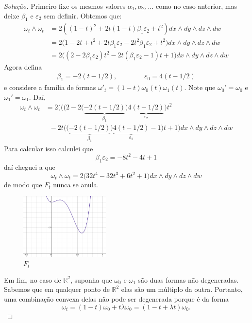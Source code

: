 \begin{proof}[Solução]
Primeiro fixe os mesmos valores $\alpha_1,\alpha_2,\ldots$ como no caso anterior, mas deixe $\beta_1$ e $\varepsilon_2$ sem definir. Obtemos que:
\begin{align*}
\omega_t\wedge \omega_t&=2\left( (1-t)^2+2t(1-t)\beta_1\varepsilon_2+t^2 \right)  dx\wedge dy\wedge dz\wedge dw\\
&=2\Big( 1-2t+t^2+2t\beta_1\varepsilon_2-2t^2\beta_1\varepsilon_2+t^2 \Big)dx\wedge dy\wedge dz\wedge dw\\
&=2\Big((2-2\beta_1\varepsilon_2)t^2-2t(\beta_1\varepsilon_2-1)t+1\Big)dx\wedge dy\wedge dz\wedge dw
\end{align*}
Agora defina
\begin{align*}
	\beta_1=-2(t-1/2),\qquad \qquad \varepsilon_0=4(t-1/2) 
\end{align*}
e considere a família de formas  $\omega'_t=(1-t)\omega_0(t) \omega_1(t)$. Note que $\omega_0'=\omega_0$ e $\omega_1'=\omega_1$. Daí,
\begin{align*}
\omega_t\wedge \omega_t&=2\Bigg(\big((2-2\big(\underbrace{-2(t-1/2)}_{\beta_1}\big)\underbrace{4(t-1/2)}_{\varepsilon_2}\big)t^2\\
&\; \;-2t\Big(\big(\underbrace{-2(t-1/2)}_{\beta_1}\big)\underbrace{4(t-1/2)}_{\varepsilon_2}-1\Big)t+1\Bigg)dx\wedge dy\wedge dz\wedge dw
\end{align*}
Para calcular isso calculei que
\[\beta_1\varepsilon_2=-8t^2-4t+1\]
daí cheguei a que
\[\omega_t\wedge \omega_t=2\big(32t^4-32t^3+6t^2+1\big)dx\wedge dy\wedge dz\wedge dw\]
de modo que $F_t$ nunca se anula.
\begin{figure}[H]
	\centering
	\includegraphics[width=0.4\textwidth]{fig1}
	\caption*{$F_t$}
\end{figure}

Em fim, no caso de $\mathbb{R}^{2}$, suponha que $\omega_0$ e $\omega_1$ são duas formas não degeneradas. Sabemos que em qualquer ponto de $\mathbb{R}^{2}$ elas são um múltiplo da outra. Portanto, uma combinação convexa delas não pode ser degenerada porque é da forma
\[\omega_t=(1-t)\omega_0+t\lambda\omega_0=(1-t+\lambda t)\omega_0.\]
\end{proof}

